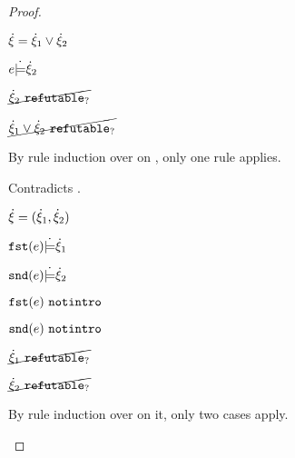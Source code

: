 \begin{proof}
\begin{byCases}
\item[\text{(\ref{rule:CSOr2})}]
    \begin{pfsteps*}
    \item $\dot{\xi}=\dot{\xi}_1 \vee \dot{\xi}_2$ 
    \item $e \dot{\models} \dot{\xi}_2$  
    \item $\cancel{\dot{\xi}_2 ~\mathtt{refutable}_?}$  
    \item $\cancel{\dot{\xi}_1 \vee \dot{\xi}_2 ~\mathtt{refutable}_?}$ 
    \end{pfsteps*}
    By rule induction over  on , only one rule applies.
    \begin{byCases}
      \item[\text{(\ref{rule:RXOr})}]
      \begin{pfsteps}
      \item {} 
      \end{pfsteps} 
      Contradicts .
    \end{byCases}
\item[\text{(\ref{rule:CSNotIntroPair})}]
    \begin{pfsteps*}
    \item $\dot{\xi}=(\dot{\xi}_1 , \dot{\xi}_2)$ 
    \item $\mathtt{fst}(e) \dot{\models} \dot{\xi}_1$  
    \item $\mathtt{snd}(e) \dot{\models} \dot{\xi}_2$  
    \item $\mathtt{fst}(e) ~\mathtt{notintro}$  
    \item $\mathtt{snd}(e) ~\mathtt{notintro}$  
    \item $\cancel{\dot{\xi}_1 ~\mathtt{refutable}_?}$  
    \item $\cancel{\dot{\xi}_2 ~\mathtt{refutable}_?}$  
    \end{pfsteps*}
    By rule induction over  on it, only two cases apply.
    \begin{byCases}
    \item[\text{(\ref{rule:RXPairL})}]

\end{byCases}
\end{byCases}
\end{proof}
